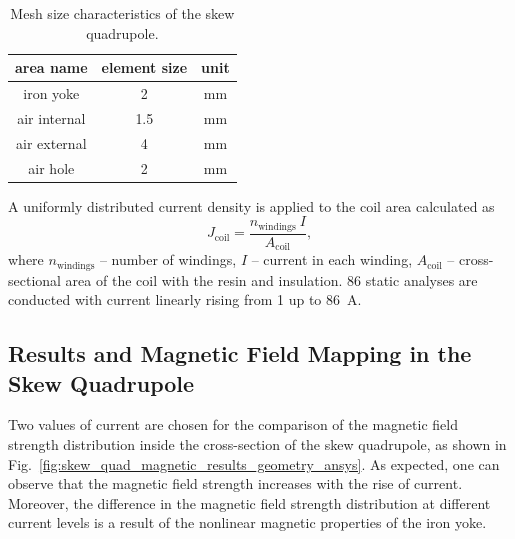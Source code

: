 \begin{table}[H]
    \caption{Mesh size characteristics of the skew quadrupole.} 
    \vspace{-1.em} 
    \fontsize{10}{10}
    \selectfont 
    \renewcommand{\arraystretch}{1.5}
    \begin{center}
        \begin{tabular}{ ccc } 
        \hline
        area name & element size & unit \\
        \hline
        iron yoke & 2 & mm \\
        air internal & 1.5 & mm \\
        air external & 4 & mm \\
        air hole & 2 & mm \\
        \hline 
        \end{tabular}
    \end{center}  
     \label{table:mesh_characteristics_magnetic_ansys} 
\end{table}

A uniformly distributed current density is applied to the coil area calculated as
\begin{equation}
    J_\text{coil} = \frac{n_\text{windings}~I}{A_\text{coil}},
\end{equation}
where $n_\text{windings}$ -- number of windings, $I$ -- current in each winding, $A_\text{coil}$ -- cross-sectional area of the coil with the resin and insulation. 86 static analyses are conducted with current linearly rising from 1 up to 86~A. 

\subsection{Results and Magnetic Field Mapping in the Skew Quadrupole}

Two values of current are chosen for the comparison of the magnetic field strength distribution inside the cross-section of the skew quadrupole, as shown in Fig.~\ref{fig:skew_quad_magnetic_results_geometry_ansys}. As expected, one can observe that the magnetic field strength increases with the rise of current. Moreover, the difference in the magnetic field strength distribution at different current levels is a result of the nonlinear magnetic properties of the iron yoke.

